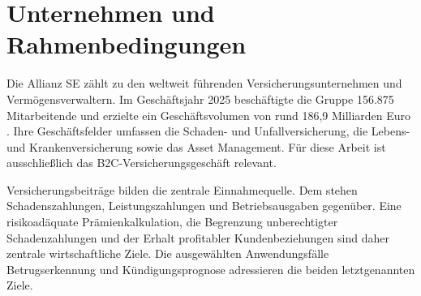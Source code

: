 \section{Unternehmen und Rahmenbedingungen}
\label{sec:geschaeftsmodell}

Die Allianz SE zählt zu den weltweit führenden Versicherungsunternehmen und
Vermögensverwaltern. Im Geschäftsjahr 2025 beschäftigte die Gruppe 156.875
Mitarbeitende und erzielte ein Geschäftsvolumen von rund 186,9 Milliarden
Euro \citep{allianzAnnualReport2025}. Ihre Geschäftsfelder umfassen die
Schaden- und Unfallversicherung, die Lebens- und Krankenversicherung sowie das
Asset Management. Für diese Arbeit ist ausschließlich das
B2C-Versicherungsgeschäft relevant.

Versicherungsbeiträge bilden die zentrale Einnahmequelle. Dem stehen
Schadenszahlungen, Leistungszahlungen und Betriebsausgaben gegenüber. Eine
risikoadäquate Prämienkalkulation, die Begrenzung unberechtigter
Schadenzahlungen und der Erhalt profitabler Kundenbeziehungen sind daher
zentrale wirtschaftliche Ziele. Die ausgewählten Anwendungsfälle
Betrugserkennung und Kündigungsprognose adressieren die beiden letztgenannten
Ziele.
